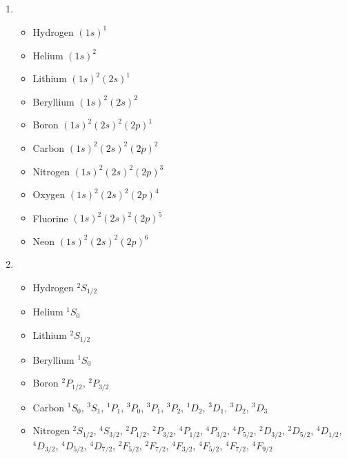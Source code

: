 \documentclass{article}
\begin{document}
\subsection{}

\begin{enumerate}
  \item

        \begin{itemize}
          \item Hydrogen $(1 s)^1$

          \item Helium $(1 s)^2$

          \item Lithium $(1 s)^2 (2 s)^1$

          \item Beryllium $(1 s)^2 (2 s)^2$

          \item Boron $(1 s)^2 (2 s)^2 (2 p)^1$

          \item Carbon $(1 s)^2 (2 s)^2 (2 p)^2$

          \item Nitrogen $(1 s)^2 (2 s)^2 (2 p)^3$

          \item Oxygen $(1 s)^2 (2 s)^2 (2 p)^4$

          \item Fluorine $(1 s)^2 (2 s)^2 (2 p)^5$

          \item Neon $(1 s)^2 (2 s)^2 (2 p)^6$
        \end{itemize}

  \item

        \begin{itemize}
          \item Hydrogen $^2 S_{1 / 2}$

          \item Helium $^1 S_0$

          \item Lithium $^2 S_{1 / 2}$

          \item Beryllium $^1 S_0$

          \item Boron $^2 P_{1 / 2}$, $^2 P_{3 / 2}$

          \item Carbon $^1 S_0$, $^3 S_1$, $^1 P_1$, $^3 P_0$, $^3 P_1$, $^3 P_2$, $^1 D_2$, $^3 D_1$, $^3 D_2$, $^3 D_3$

          \item Nitrogen $^2 S_{1 / 2}$, $^4 S_{3 / 2}$, $^2 P_{1 / 2}$, $^2 P_{3 / 2}$, $^4 P_{1 / 2}$, $^4 P_{3 / 2}$, $^4 P_{5 / 2}$, $^2 D_{3 / 2}$, $^2 D_{5 / 2}$, $^4 D_{1 / 2}$, $^4 D_{3 / 2}$, $^4 D_{5 / 2}$, $^4 D_{7 / 2}$, $^2 F_{5 / 2}$, $^2 F_{7 / 2}$, $^4 F_{3 / 2}$, $^4 F_{5 / 2}$, $^4 F_{7 / 2}$, $^4 F_{9 / 2}$
        \end{itemize}
\end{enumerate}
\end{document}
